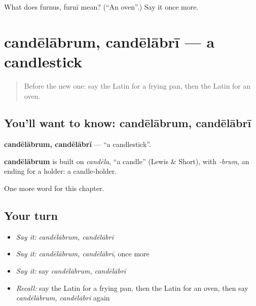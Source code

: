 \begin{tcolorbox}[breakable,colback=teal!4,colframe=teal!35!black,title={Before you move on}]
What does furnus, furnī mean? (\textquotedblleft{}An oven\textquotedblright{}.) Say it once more.
\end{tcolorbox}
\section[candēlābrum, candēlābrī]{candēlābrum, candēlābrī — a candlestick}

\label{lesson:LA-C252-candelabrum}



\begin{quote}
Before the new one: say the Latin for a frying pan, then the Latin for an oven.
\end{quote}

\subsection*{You'll want to know: candēlābrum, candēlābrī}
\textbf{candēlābrum, candēlābrī} — \textquotedblleft{}a candlestick\textquotedblright{}.

\begin{cousinweb}
\textbf{candēlābrum} is built on \emph{candēla}, \textquotedblleft{}a candle\textquotedblright{} (Lewis \& Short), with \emph{-brum}, an ending for a holder: a candle-holder.
\end{cousinweb}

\begin{grammarlens}[title={What you've built}]
One more word for this chapter.
\end{grammarlens}

\subsection*{Your turn}
\begin{itemize}
\raggedright
  \item \emph{Say it:} \emph{candēlābrum, candēlābrī}
  \item \emph{Say it:} \emph{candēlābrum, candēlābrī}, once more
  \item \emph{Say it:} say \emph{candēlābrum, candēlābrī}
  \item \emph{Recall:} say the Latin for a frying pan, then the Latin for an oven, then say \emph{candēlābrum, candēlābrī} again
\end{itemize}

